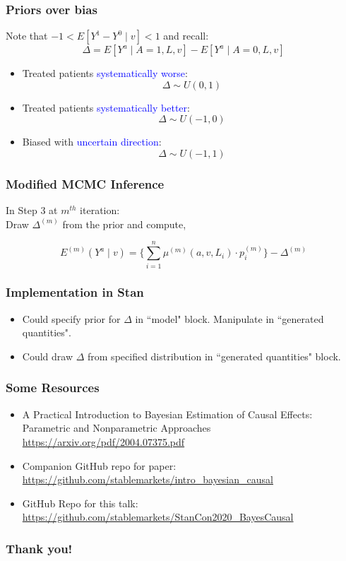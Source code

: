 \documentclass[xcolor=x11names,compress]{beamer}
\renewcommand{\(}{\begin{columns}}
\renewcommand{\)}{\end{columns}}
\newcommand{\<}[1]{\begin{column}{#1}}
\renewcommand{\>}{\end{column}}
\begin{document}
\begin{frame}
	\frametitle{Priors over bias}
	Note that $-1 < E[Y^1 - Y^0 \mid v ] < 1$ and recall:
	$$\Delta  = E[Y^a \mid A=1, L, v] - E[Y^a \mid A=0, L, v] $$
	
	\begin{itemize}
		\pause
		\item Treated patients \textcolor{blue}{systematically worse}:
		$$ \Delta \sim U(0, 1) $$
		
		\pause
		\item Treated patients \textcolor{blue}{systematically better}:
		$$ \Delta \sim U(-1, 0) $$
		
		\pause
		\item Biased with \textcolor{blue}{uncertain direction}:
		$$ \Delta \sim U(-1,1) $$		
	\end{itemize}
\end{frame}

\begin{frame}
	\frametitle{Modified MCMC Inference}

	In Step 3 at $m^{th}$ iteration: \\


	Draw $\Delta^{(m)}$ from the prior and compute, 
	
	$$ E^{(m)}(Y^a \mid v ) =  \Big\{ \sum_{i=1}^n \mu^{(m)}( a, v, L_i ) \cdot p_i^{(m)} \Big\} - \Delta^{(m)} $$

\end{frame}

\begin{frame}
	\frametitle{Implementation in Stan}

	\begin{itemize}
		\item Could specify prior for $\Delta$ in ``model" block. Manipulate in ``generated quantities".
		\item Could draw $\Delta$ from specified distribution in ``generated quantities" block.
	\end{itemize}
\end{frame}

\begin{frame}
	\frametitle{Some Resources}

	\begin{itemize}
		\item A Practical Introduction to Bayesian Estimation of Causal Effects: Parametric and Nonparametric Approaches
		\url{https://arxiv.org/pdf/2004.07375.pdf}
		\item Companion GitHub repo for paper:
		\url{https://github.com/stablemarkets/intro_bayesian_causal}
		\item GitHub Repo for this talk:
		\url{https://github.com/stablemarkets/StanCon2020_BayesCausal}
	\end{itemize}
\end{frame}

\begin{frame}
	\frametitle{Thank you!}

\end{frame}
\end{document}
